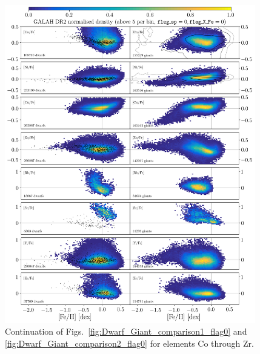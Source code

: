 \documentclass[fleqn,usenatbib,useAMS]{mnras}
\begin{document}
\begin{figure}
  \includegraphics[width=0.975\textwidth]{Figures/Dwarf_Giant_comparison3_flag0.png}
\caption{Continuation of Figs.~\ref{fig:Dwarf_Giant_comparison1_flag0} and \ref{fig:Dwarf_Giant_comparison2_flag0} for elements Co through Zr.}
  \label{fig:Dwarf_Giant_comparison3_flag0}
\end{figure}
\end{document}

